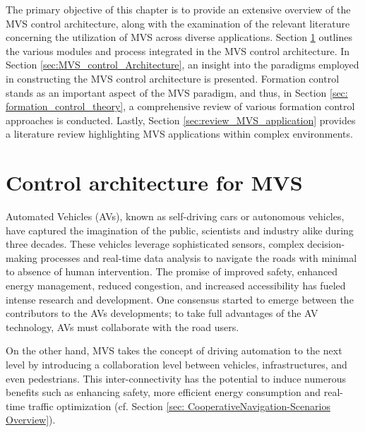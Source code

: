 The primary objective of this chapter is to provide an extensive overview of the MVS control architecture, along with the examination of the relevant literature concerning the utilization of MVS across diverse applications. Section \ref{sec:control_architecture_for_MVS} outlines the various modules and process integrated in the MVS control architecture. In Section \ref{sec:MVS_control_Architecture}, an insight into the paradigms employed in constructing the MVS control architecture is presented. Formation control stands as an important aspect of the MVS paradigm, and thus, in Section \ref{sec: formation_control_theory}, a comprehensive review of various formation control approaches is conducted. Lastly, Section \ref{sec:review_MVS_application} provides a literature review highlighting MVS applications within complex environments.  



\section{Control architecture for MVS} \label{sec:control_architecture_for_MVS}
Automated Vehicles (AVs), known as self-driving cars or autonomous vehicles, have captured the imagination of the public, scientists and industry alike during three decades. These vehicles leverage sophisticated sensors, complex decision-making processes and real-time data analysis to navigate the roads with minimal to absence of human intervention. The promise of improved safety, enhanced energy management, reduced congestion, and increased accessibility has fueled intense research and development. One consensus started to emerge between the contributors to the AVs developments; to take full advantages of the AV technology, AVs must collaborate with the road users.

On the other hand, MVS takes the concept of driving automation to the next level by introducing a collaboration level between vehicles, infrastructures, and even pedestrians. This inter-connectivity has the potential to induce numerous benefits such as enhancing safety, more efficient energy consumption and real-time traffic optimization (cf. Section \ref{sec: CooperativeNavigation-Scenarios Overview}).  

